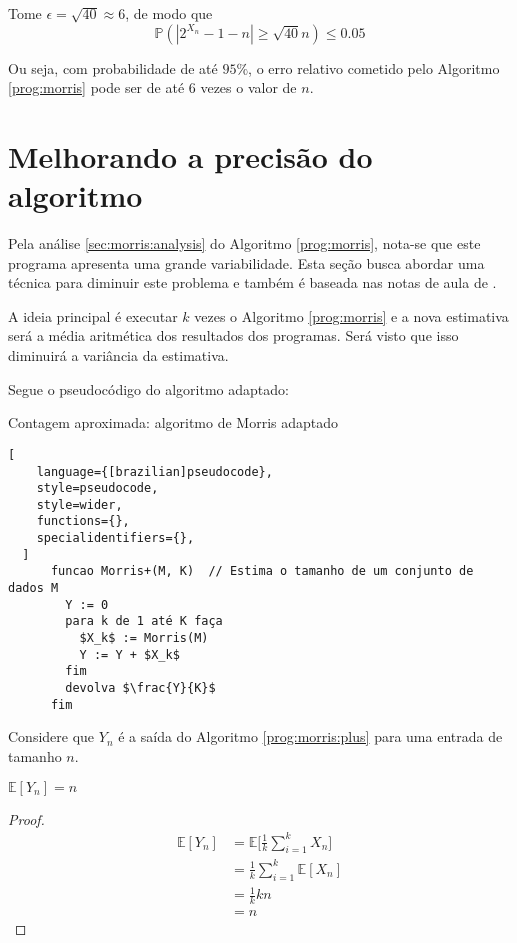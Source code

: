 Tome $\epsilon = \sqrt{40} \approx 6 $, de modo que 
\[ \mathbb{P}(|2^{X_n} - 1 - n| \geq \sqrt{40} n)  \leq 0.05 \]

Ou seja, com probabilidade de até $95\%$, o erro relativo cometido pelo Algoritmo \ref{prog:morris} pode ser de até $6$ vezes o valor de $n$.


\section{Melhorando a precisão do algoritmo}

Pela análise \ref{sec:morris:analysis} do Algoritmo \ref{prog:morris}, nota-se que este programa apresenta uma grande variabilidade. 
Esta seção busca abordar uma técnica para diminuir este problema e também é baseada nas notas de aula de \citep{LectureNotesAndoni}.

A ideia principal é executar $k$ vezes o Algoritmo \ref{prog:morris} e a nova estimativa será a média aritmética dos resultados
dos programas. Será visto que isso diminuirá a variância da estimativa.

Segue o pseudocódigo do algoritmo adaptado:
\begin{programruledcaption}{Contagem aproximada: algoritmo de Morris adaptado\label{prog:morris:plus}}
  \begin{lstlisting}[
    language={[brazilian]pseudocode},
    style=pseudocode,
    style=wider,
    functions={},
    specialidentifiers={},
  ]
      funcao Morris+(M, K)  // Estima o tamanho de um conjunto de dados M
        Y := 0
        para k de 1 até K faça
          $X_k$ := Morris(M)
          Y := Y + $X_k$
        fim
        devolva $\frac{Y}{K}$
      fim
  \end{lstlisting}
\end{programruledcaption}

Considere que $Y_n$ é a saída do Algoritmo \ref{prog:morris:plus} para uma entrada de tamanho $n$.

\begin{lemma}\label{morris:plus:expected_value}
  $\mathbb{E}[Y_n] = n$
\end{lemma}

\begin{proof}

\begin{align*}
  \mathbb{E}[Y_n] 
    &= \mathbb{E} \Big[ \frac{1}{k} \sum_{i=1}^{k} X_n \Big]  \\
    &= \frac{1}{k} \sum_{i=1}^{k} \mathbb{E}[X_n] \\
    &= \frac{1}{k} k n  \\
    &= n
\end{align*}

\end{proof}

